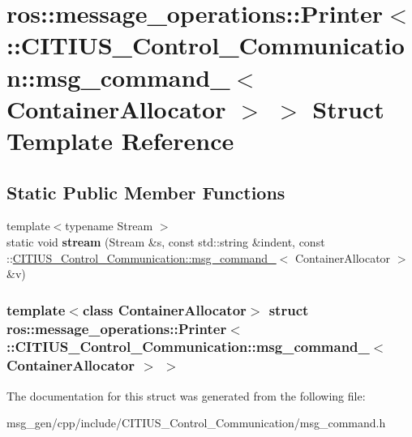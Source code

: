\hypertarget{structros_1_1message__operations_1_1_printer_3_01_1_1_c_i_t_i_u_s___control___communication_1_1m80fdb549103008d72b444131068064fb}{\section{ros\-:\-:message\-\_\-operations\-:\-:\-Printer$<$ \-:\-:\-C\-I\-T\-I\-U\-S\-\_\-\-Control\-\_\-\-Communication\-:\-:msg\-\_\-command\-\_\-$<$ \-Container\-Allocator $>$ $>$ \-Struct \-Template \-Reference}
\label{structros_1_1message__operations_1_1_printer_3_01_1_1_c_i_t_i_u_s___control___communication_1_1m80fdb549103008d72b444131068064fb}
}
\subsection*{\-Static \-Public \-Member \-Functions}
\begin{DoxyCompactItemize}
\item 
\hypertarget{structros_1_1message__operations_1_1_printer_3_01_1_1_c_i_t_i_u_s___control___communication_1_1m80fdb549103008d72b444131068064fb_a50d2d96cc68c18b347b5e0a97b5af994}{{\footnotesize template$<$typename Stream $>$ }\\static void {\bfseries stream} (\-Stream \&s, const std\-::string \&indent, const \-::\hyperlink{struct_c_i_t_i_u_s___control___communication_1_1msg__command__}{\-C\-I\-T\-I\-U\-S\-\_\-\-Control\-\_\-\-Communication\-::msg\-\_\-command\-\_\-}$<$ \-Container\-Allocator $>$ \&v)}\label{structros_1_1message__operations_1_1_printer_3_01_1_1_c_i_t_i_u_s___control___communication_1_1m80fdb549103008d72b444131068064fb_a50d2d96cc68c18b347b5e0a97b5af994}

\end{DoxyCompactItemize}
\subsubsection*{template$<$class Container\-Allocator$>$ struct ros\-::message\-\_\-operations\-::\-Printer$<$ \-::\-C\-I\-T\-I\-U\-S\-\_\-\-Control\-\_\-\-Communication\-::msg\-\_\-command\-\_\-$<$ Container\-Allocator $>$ $>$}



\-The documentation for this struct was generated from the following file\-:\begin{DoxyCompactItemize}
\item 
msg\-\_\-gen/cpp/include/\-C\-I\-T\-I\-U\-S\-\_\-\-Control\-\_\-\-Communication/msg\-\_\-command.\-h\end{DoxyCompactItemize}

